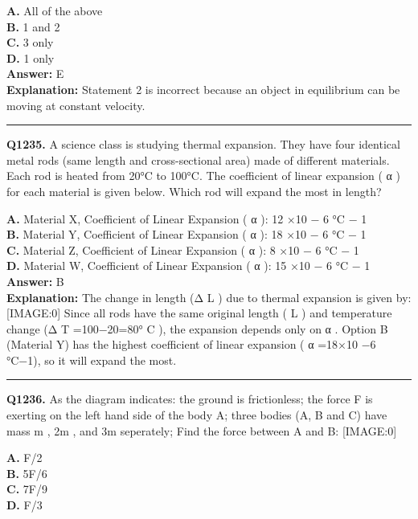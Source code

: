 \documentclass[12pt]{article}
\begin{document}
\textbf{A.} All of the above \\
\textbf{B.} 1 and 2 \\
\textbf{C.} 3 only \\
\textbf{D.} 1 only \\

\textbf{Answer:} E \\
\textbf{Explanation:} Statement 2 is incorrect because an object in equilibrium can be moving at constant velocity.

\hrule
\vspace{1em}


\noindent
\textbf{Q1235.} A science class is studying thermal expansion. They have four identical metal rods (same length and cross-sectional area) made of different materials. Each rod is heated from 20°C to 100°C. The coefficient of linear expansion (
α
) for each material is given below.
Which rod will expand the most in length?



\textbf{A.} Material X, Coefficient of Linear Expansion (
α
):
12
×10
−
6
°C
−
1 \\
\textbf{B.} Material Y, Coefficient of Linear Expansion (
α
):
18
×10
−
6
°C
−
1 \\
\textbf{C.} Material Z, Coefficient of Linear Expansion (
α
):
8
×10
−
6
°C
−
1 \\
\textbf{D.} Material W, Coefficient of Linear Expansion (
α
):
15
×10
−
6
°C
−
1 \\

\textbf{Answer:} B \\
\textbf{Explanation:} The change in length (Δ
L
) due to thermal expansion is given by:
[IMAGE:0]
Since all rods have the same original length (
L
) and temperature change (Δ
T
=100−20=80°
C
), the expansion depends only on
α
.
Option B (Material Y) has the highest coefficient of linear expansion (
α
=18×10
−6
°C−1), so it will expand the most.

\hrule
\vspace{1em}


\noindent
\textbf{Q1236.} As the diagram indicates: the ground is frictionless; the force
F
is exerting on the left hand side of the body A; three bodies (A, B and C) have mass
m
,
2m
, and
3m
seperately; Find the force between A and B:
[IMAGE:0]



\textbf{A.} F/2 \\
\textbf{B.} 5F/6 \\
\textbf{C.} 7F/9 \\
\textbf{D.} F/3 \\
\end{document}

